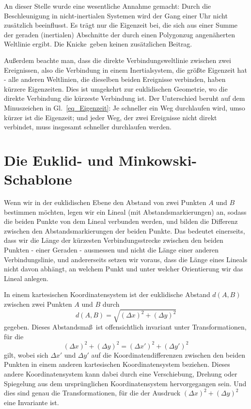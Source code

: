 An dieser Stelle wurde eine wesentliche Annahme gemacht: Durch die Beschleunigung
in nicht-inertialen Systemen wird der Gang einer Uhr nicht zus\"atzlich beeinflusst. 
Es tr\"agt nur die Eigenzeit bei, die sich aus einer Summe der geraden (inertialen)
Abschnitte der durch einen Polygonzug angen\"aherten Weltlinie ergibt. Die
\glqq Knicke\grqq\ geben keinen zus\"atzlichen Beitrag. 

Au\ss erdem beachte man, dass die direkte Verbindungsweltlinie zwischen zwei Ereignissen,
also die Verbindung in einem Inertialsystem, die gr\"o\ss te Eigenzeit hat - alle anderen
Weltlinien, die dieselben beiden Ereignisse verbinden, haben k\"urzere Eigenzeiten. 
Dies ist umgekehrt zur euklidischen Geometrie, wo die direkte Verbindung die k\"urzeste
Verbindung ist. Der Unterschied beruht auf dem Minuszeichen in 
Gl.\ \ref{eq_Eigenzeit}: Je schneller ein Weg durchlaufen wird, umso k\"urzer ist die
Eigenzeit; und jeder Weg, der zwei Ereignisse nicht direkt verbindet, muss insgesamt
schneller durchlaufen werden.

\section{Die Euklid- und Minkowski-Schablone}

Wenn wir in der euklidischen Ebene den Abstand von zwei Punkten $A$ und $B$ bestimmen m\"ochten,
legen wir ein Lineal (mit Abstandsmarkierungen) an, sodass die beiden Punkte von dem
Lineal verbunden werden, und bilden die Differenz zwischen den Abstandsmarkierungen
der beiden Punkte. Das bedeutet einerseits, dass wir die L\"ange der k\"urzesten Verbindungsstrecke
zwischen den beiden Punkten - einer Geraden - ausmessen und nicht die L\"ange einer anderen Verbindungslinie,
und andererseits setzen wir voraus, dass die L\"ange eines Lineals nicht davon abh\"angt, an welchem
Punkt und unter welcher Orientierung wir das Lineal anlegen. 

In einem kartesischen Koordinatensystem ist der euklidische Abstand $d(A,B)$ zwischen zwei Punkten 
$A$ und $B$ durch 
\begin{equation}
                   d(A,B) = \sqrt{(\Delta x)^2 + (\Delta y)^2}
\end{equation}
gegeben. Dieses Abstandsma\ss\ ist offensichtlich invariant unter Transformationen,
f\"ur die
\begin{equation}
                  (\Delta x)^2 + (\Delta y)^2  =   (\Delta x')^2 + (\Delta y')^2
\end{equation}
gilt, wobei sich $\Delta x'$ und $\Delta y'$ auf die Koordinatendifferenzen zwischen den beiden
Punkten in einem anderen kartesischen Koordinatensystem beziehen. Dieses andere Koordinatensystem
kann dabei durch eine Verschiebung, Drehung oder Spiegelung aus dem urspr\"unglichen Koordinatensystem
hervorgegangen sein. Und dies sind genau die Transformationen, f\"ur die der Ausdruck
$(\Delta x)^2 + (\Delta y)^2$ eine Invariante ist.  

